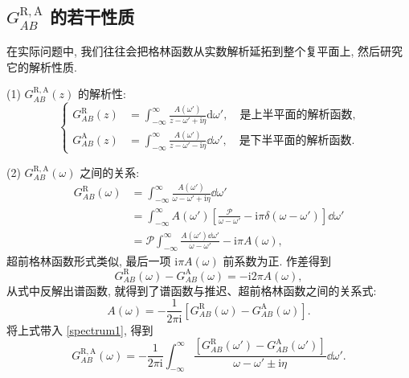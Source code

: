 \subsection{$G_{AB}^{\mathrm{R,A}}$ 的若干性质}
在实际问题中, 我们往往会把格林函数从实数解析延拓到整个复平面上, 然后研究它的解析性质.

    (1)  $G_{AB}^{\mathrm{R,A}}(z)$ 的解析性:
    \begin{equation}
        \left\{
            \begin{aligned}
                G_{AB}^{\mathrm{R}}(z)&=\int_{-\infty}^\infty\frac{A(\omega')}{z-\omega'+\mathrm{i}\eta}\mathrm{d}\omega',\quad\mbox{是上半平面的解析函数,}\\
                G_{AB}^{\mathrm{A}}(z)&=\int_{-\infty}^\infty\frac{A(\omega')}{z-\omega'-\mathrm{i}\eta}\dd \omega',\quad \mbox{是下半平面的解析函数.}
            \end{aligned}
        \right.
    \end{equation}  

    (2)  $G_{AB}^{\mathrm{R,A}}(\omega)$ 之间的关系:
        \begin{align}
            G_{AB}^{\mathrm{R}}(\omega)&=\int_{-\infty}^\infty\frac{A(\omega')}{\omega-\omega'+\mathrm{i}\eta}\dd\omega'\nonumber\\
            &=\int_{-\infty}^\infty A(\omega')\left[ \frac{\mathcal{P}}{\omega-\omega'}-\mathrm{i}\pi\delta(\omega-\omega') \right]\dd\omega'\nonumber\\
            &=\mathcal{P}\int_{-\infty}^\infty\frac{A(\omega')\dd\omega'}{\omega-\omega'}-\mathrm{i}\pi A(\omega),
        \end{align}
    超前格林函数形式类似, 最后一项 $\mathrm{i}\pi A(\omega)$ 前系数为正. 作差得到
    \begin{equation}
        G_{AB}^{\mathrm{R}}(\omega)-G_{AB}^{\mathrm{A}}(\omega)=-\mathrm{i} 2\pi A(\omega),
    \end{equation}
    从式中反解出谱函数, 就得到了谱函数与推迟、超前格林函数之间的关系式:
    \begin{equation}
       A(\omega)=-\frac{1}{2\pi\mathrm{i}}\left[ G_{AB}^{\mathrm{R}}(\omega)-G_{AB}^{\mathrm{A}}(\omega) \right].
        \label{spectrum2}
    \end{equation}
    将上式带入 \eqref{spectrum1}, 得到
    \begin{equation}
        G_{AB}^{\mathrm{R,A}}(\omega)=-\frac{1}{2\pi\mathrm{i}}\int_{-\infty}^\infty \frac{\left[ G_{AB}^{\mathrm{R}}(\omega')-G_{AB}^{\mathrm{A}}(\omega') \right]}{\omega-\omega'\pm \mathrm{i}\eta}\dd\omega'.
    \end{equation}

